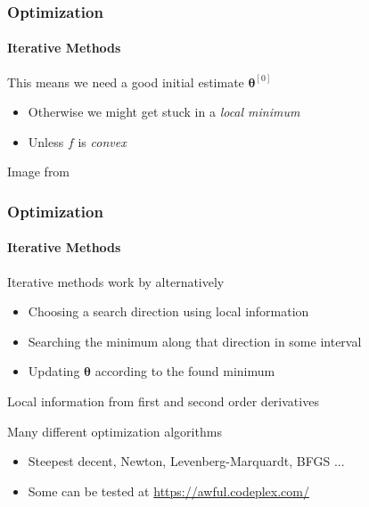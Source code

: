 \documentclass[xetex,professionalfont]{beamer}
\newcommand{\bth}{\boldsymbol{\theta}}
\begin{document}
\begin{frame}[fragile]
\frametitle{Optimization}
\framesubtitle{Iterative Methods}

This means we need a good initial estimate $\bth^{[0]}$
\begin{itemize}
    \item Otherwise we might get stuck in a \emph{local minimum} %
    \item Unless $f$ is \emph{convex} %
\end{itemize}

\begin{center}
    {\centering Image from \cite{prince12}}
\end{center}

\end{frame}


\begin{frame}
\frametitle{Optimization}
\framesubtitle{Iterative Methods}

Iterative methods work by alternatively
\begin{itemize}
    \item Choosing a search direction using local information
    \item Searching the minimum along that direction in some interval
    \item Updating $\bth$ according to the found minimum
\end{itemize}

\bigskip
Local information from first and second order derivatives %

\bigskip
Many different optimization algorithms
\begin{itemize}
    \item Steepest decent, Newton, Levenberg-Marquardt, BFGS ... %
    \item Some can be tested at \url{https://awful.codeplex.com/}
\end{itemize}

\end{frame}
\end{document}
